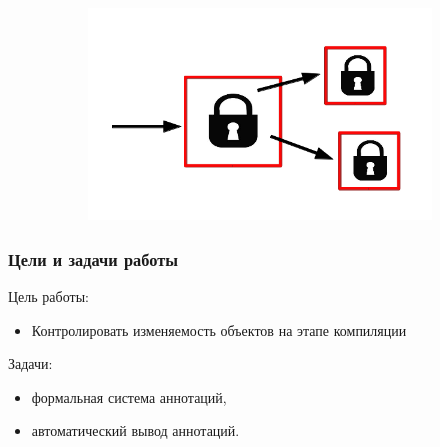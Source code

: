 \documentclass[10pt,pdf,hyperref={unicode}]{beamer}
\begin{document}
\begin{frame}
\begin{figure}[p]
\begin{subfigure}[b]{0.6\textwidth}
    	\includegraphics[scale=0.25]{pics/3.png}
	\end{subfigure}	
\end{figure}
\end{frame}



%	
	
\begin{frame}
	\transwipe
	\frametitle{Цели и задачи работы}
	Цель работы:
	\begin{itemize}
	\item
	Контролировать изменяемость объектов на этапе компиляции
	\end{itemize}

	Задачи:
	\begin{itemize}
	\item 
		формальная система аннотаций,
	\item 
		автоматический вывод аннотаций.
	\end{itemize}
\end{frame}
\end{document}
